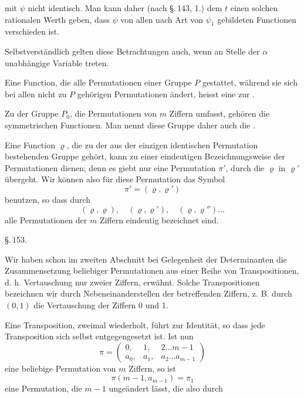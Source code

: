 mit $\psi$ nicht identisch. Man kann daher (nach \S.\,143, 1.) dem $t$ einen solchen rationalen Werth geben, dass $\psi$ von allen nach Art von $\psi_1$ gebildeten Functionen verschieden ist.

Selbstverständlich gelten diese Betrachtungen auch, wenn an Stelle der $\alpha$ unabhängige Variable treten.

Eine Function, die alle Permutationen einer Gruppe $P$ gestattet, während sie sich bei allen nicht zu $P$ gehörigen Permutationen ändert, heisst eine zur .

Zu der Gruppe $P_0$, die  Permutationen von $m$ Ziffern umfasst, gehören die symmetrischen Functionen. Man nennt diese Gruppe daher auch die .

Eine Function $\varrho$, die zu der aus der einzigen identischen Permutation bestehenden Gruppe gehört, kann zu einer eindeutigen Bezeichnungsweise der Permutationen dienen; denn es giebt nur eine Permutation $\pi'$, durch die $\varrho$ in $\varrho'$ übergeht. Wir können also für diese Permutation das Symbol
\[
\pi' = (\varrho, \varrho')
\]
benutzen, so dass durch
\[
(\varrho, \varrho), \quad (\varrho, \varrho'), \quad (\varrho, \varrho'') \dots
\]
alle Permutationen der $m$ Ziffern eindeutig bezeichnet sind.

\begin{center}
\S.\,153.

\end{center}

Wir haben schon im zweiten Abschnitt bei Gelegenheit der Determinanten die Zusammensetzung beliebiger Permutationen aus einer Reihe von Transpositionen, d. h. Vertauschung nur zweier Ziffern, erwähnt. Solche Transpositionen bezeichnen wir durch Nebeneinanderstellen der betreffenden Ziffern, z. B. durch $(0,1)$ die Vertauschung der Ziffern 0 und 1.

Eine Transposition, zweimal wiederholt, führt zur Identität, so dass jede Transposition sich selbst entgegengesetzt ist. Ist nun
\[
\pi = \begin{pmatrix} 0, & 1, & 2 \dots m-1 \\ a_0, & a_1, & a_2 \dots a_{m-1} \end{pmatrix}
\]
eine beliebige Permutation von $m$ Ziffern, so ist
\[
\pi(m-1, a_{m-1}) = \pi_1
\]
eine Permutation, die $m-1$ ungeändert lässt, die also durch
